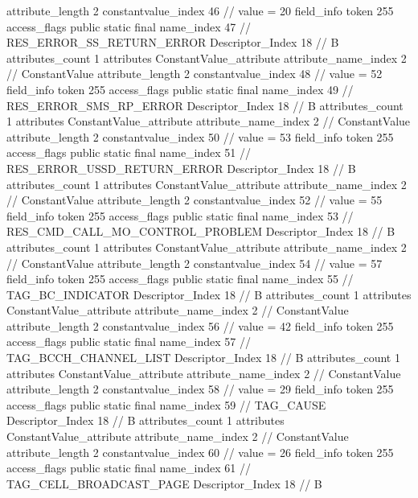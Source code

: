 {{{{{{{					attribute_length	2
					constantvalue_index	46		// value = 20
				}
				}
			}
			field_info {
				token	255
				access_flags	public static final
				name_index	47		// RES_ERROR_SS_RETURN_ERROR
				Descriptor_Index	18		// B
				attributes_count	1
				attributes {
				ConstantValue_attribute {
					attribute_name_index	2		// ConstantValue
					attribute_length	2
					constantvalue_index	48		// value = 52
				}
				}
			}
			field_info {
				token	255
				access_flags	public static final
				name_index	49		// RES_ERROR_SMS_RP_ERROR
				Descriptor_Index	18		// B
				attributes_count	1
				attributes {
				ConstantValue_attribute {
					attribute_name_index	2		// ConstantValue
					attribute_length	2
					constantvalue_index	50		// value = 53
				}
				}
			}
			field_info {
				token	255
				access_flags	public static final
				name_index	51		// RES_ERROR_USSD_RETURN_ERROR
				Descriptor_Index	18		// B
				attributes_count	1
				attributes {
				ConstantValue_attribute {
					attribute_name_index	2		// ConstantValue
					attribute_length	2
					constantvalue_index	52		// value = 55
				}
				}
			}
			field_info {
				token	255
				access_flags	public static final
				name_index	53		// RES_CMD_CALL_MO_CONTROL_PROBLEM
				Descriptor_Index	18		// B
				attributes_count	1
				attributes {
				ConstantValue_attribute {
					attribute_name_index	2		// ConstantValue
					attribute_length	2
					constantvalue_index	54		// value = 57
				}
				}
			}
			field_info {
				token	255
				access_flags	public static final
				name_index	55		// TAG_BC_INDICATOR
				Descriptor_Index	18		// B
				attributes_count	1
				attributes {
				ConstantValue_attribute {
					attribute_name_index	2		// ConstantValue
					attribute_length	2
					constantvalue_index	56		// value = 42
				}
				}
			}
			field_info {
				token	255
				access_flags	public static final
				name_index	57		// TAG_BCCH_CHANNEL_LIST
				Descriptor_Index	18		// B
				attributes_count	1
				attributes {
				ConstantValue_attribute {
					attribute_name_index	2		// ConstantValue
					attribute_length	2
					constantvalue_index	58		// value = 29
				}
				}
			}
			field_info {
				token	255
				access_flags	public static final
				name_index	59		// TAG_CAUSE
				Descriptor_Index	18		// B
				attributes_count	1
				attributes {
				ConstantValue_attribute {
					attribute_name_index	2		// ConstantValue
					attribute_length	2
					constantvalue_index	60		// value = 26
				}
				}
			}
			field_info {
				token	255
				access_flags	public static final
				name_index	61		// TAG_CELL_BROADCAST_PAGE
				Descriptor_Index	18		// B
}}}}}
